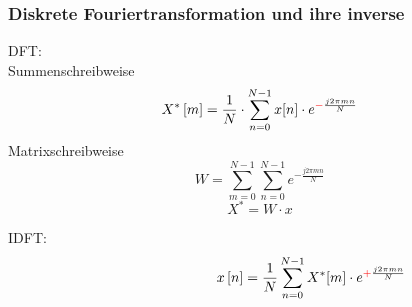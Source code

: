 \begin{frame}\frametitle{Diskrete Fouriertransformation und ihre inverse}


\vspace{0.5cm}
\hspace{1cm}
DFT:\\
\vspace{0.5cm}\hspace{1cm}
Summenschreibweise
\begin{equation*}
 X^* \left[ m \right] = \frac{1}{N} \cdot \sum^{N-1}_{n=0} x[n] \cdot e^{\textcolor{red}{-}\frac{j 2 \pi m n}{N}}
\end{equation*}
\hspace{1cm}
Matrixschreibweise
\begin{equation*}
 W = \sum_{m=0}^{N-1} \sum_{n=0}^{N-1} e^{-\frac{j 2 \pi m n}{N}}
 \end{equation*}
 \pause
 \begin{equation*}
 \boxed{X^* = W \cdot x}
\end{equation*}

\medskip
\pause
\hspace{1cm}
IDFT:
\begin{equation*}\label{eq:idft}
\quad \quad \quad \quad \quad \quad \quad \,\, x \left[ n \right] = \frac{1}{N} \sum^{N-1}_{n=0} X^*[m] \cdot e^{\textcolor{red}{+}\frac{j 2 \pi m n}{N}}
\end{equation*}

\end{frame}




